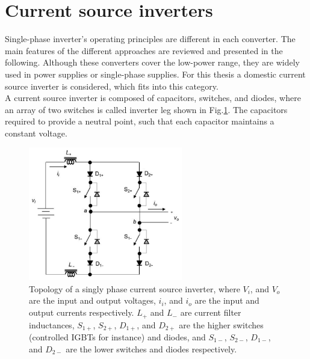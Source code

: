 \section{Current source inverters}\label{BASICCSR:sec:CSI}

Single-phase inverter's operating principles are different in each converter. The main features of the different approaches are reviewed and presented in the following. Although these converters cover the low-power range, they are widely used in power supplies or single-phase supplies. For this thesis a domestic current source inverter is considered, which fits into this category.\\
A current source inverter is composed of capacitors, switches, and diodes, where an array of two switches is called inverter leg shown in Fig.\ref{BASICCSR:fig:SingleCSI}. The capacitors required to provide a neutral point, such that each capacitor maintains a constant voltage.

\begin{figure}[!ht]
        \centering
        \includegraphics[width=0.6\textwidth]{EMPC_PNG_Pics/CurrentSourceInverter.png}
        \caption{Topology of a singly phase current source inverter, where $V_i$, and $V_o$ are the input and output voltages, $i_i$, and $i_o$ are the input and output currents respectively. $L_+$ and $L_-$ are current filter inductances, $S_{1+}$, $S_{2+}$, $D_{1+}$, and $D_{2+}$ are the higher switches (controlled IGBTs for instance) and diodes, and $S_{1-}$, $S_{2-}$, $D_{1-}$, and $D_{2-}$ are the lower switches and diodes respectively.}
        \label{BASICCSR:fig:SingleCSI}
    \end{figure}

